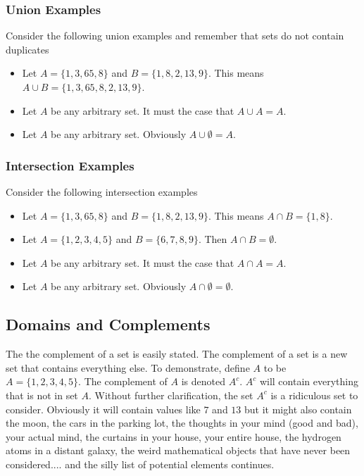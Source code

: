 \subsubsection*{Union Examples}
Consider the following union examples and remember that sets do not contain duplicates
\begin{itemize}
    \item Let $A = \{1,3,65,8\}$ and $B = \{1,8,2,13,9\}$. This means $A \cup B = \{1,3,65,8,2,13,9\}$.
    \item Let $A$ be any arbitrary set.  It must the case that  $A\cup A = A$.
    \item Let $A$ be any arbitrary set.  Obviously $A \cup \emptyset = A$.
\end{itemize}

\subsubsection*{Intersection Examples}
Consider the following intersection examples
\begin{itemize}
    \item Let $A = \{1,3,65,8\}$ and $B = \{1,8,2,13,9\}$. This means $A \cap B = \{1,8\}$.
    \item Let $A = \{1,2,3,4,5\}$ and $B = \{6,7,8,9\}$. Then $A\cap B = \emptyset$.
    \item Let $A$ be any arbitrary set.  It must the case that  $A\cap A = A$.
    \item Let $A$ be any arbitrary set.  Obviously $A \cap \emptyset = \emptyset$.
\end{itemize}

\subsection*{Domains and Complements}
The the complement of a set is easily stated.  The complement of a set is a new set that contains everything else.  To demonstrate, define $A$ to be  $A = \{1,2,3,4,5\}$.  The complement of $A$ is denoted $A^c$.  $A^c$ will contain everything that is not in set $A$.  Without further clarification, the set $A^c$ is a ridiculous set to consider.  Obviously it will contain values like $7$ and $13$ but it might also contain the moon, the cars in the parking lot, the thoughts in your mind (good and bad), your actual mind, the curtains in your house, your entire house, the hydrogen atoms in a distant galaxy, the weird mathematical objects that have never been considered.... and the silly list of potential elements continues. 


